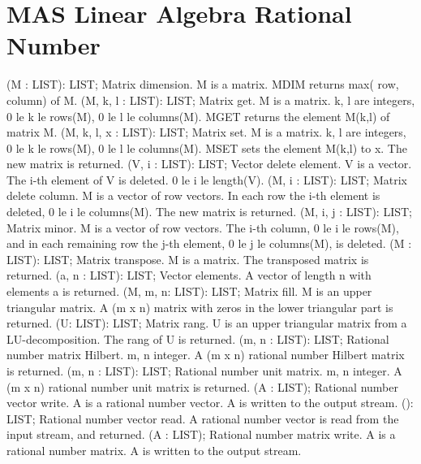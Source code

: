 \section{ MAS Linear Algebra Rational Number  } 
 (M : LIST): LIST; \eproc
\bcom Matrix dimension. M is a matrix. MDIM returns
max( row, column) of M.  \ecom 
{} (M, k, l : LIST): LIST; \eproc
\bcom Matrix get. M is a matrix. k, l are integers, 0 le k le rows(M),
0 le l le columns(M). MGET returns the element M(k,l) of matrix M.  \ecom 
{} (M, k, l, x : LIST): LIST; \eproc
\bcom Matrix set. M is a matrix. k, l are integers, 0 le k le rows(M),
0 le l le  columns(M). MSET sets the element M(k,l) to x. 
The new matrix is returned.  \ecom 
{} (V, i : LIST): LIST; \eproc
\bcom Vector delete element. V is a vector. The i-th element of V
is deleted. 0 le i le length(V).  \ecom 
{} (M, i : LIST): LIST; \eproc
\bcom Matrix delete column. M is a vector of row vectors. In each
row the i-th element is deleted, 0 le i le  columns(M). The new 
matrix is returned.  \ecom 
{} (M, i, j : LIST): LIST; \eproc
\bcom Matrix minor. M is a vector of row vectors. The i-th column,
0 le i le  rows(M), and in each remaining row the j-th element,
0 le j le columns(M), is deleted.  \ecom 
{} (M : LIST): LIST; \eproc
\bcom Matrix transpose. M is a matrix. The transposed matrix is returned.  \ecom 
{} (a, n : LIST): LIST; \eproc
\bcom Vector elements. A vector of length n with elements a is returned.  \ecom 
{} (M, m, n: LIST): LIST; \eproc
\bcom Matrix fill. M is an upper triangular matrix. A (m x n) matrix
with zeros in the lower triangular part is returned.  \ecom 
{} (U: LIST): LIST; \eproc
\bcom Matrix rang. U is an upper triangular matrix from a
LU-decomposition. The rang of U is returned.  \ecom 
{} (m, n : LIST): LIST; \eproc
\bcom Rational number matrix Hilbert. m, n integer. A (m x n) rational
number Hilbert matrix is returned.  \ecom 
{} (m, n : LIST): LIST; \eproc
\bcom Rational number unit matrix. m, n integer. A (m x n) rational
number unit matrix is returned.  \ecom 
{} (A : LIST); \eproc
\bcom Rational number vector write. A is a rational number vector.
A is written to the output stream.  \ecom 
{} (): LIST; \eproc
\bcom Rational number vector read. A rational number vector is
read from the input stream, and returned.  \ecom 
{} (A : LIST); \eproc
\bcom Rational number matrix write. A is a rational number matrix.
A is written to the output stream.  \ecom 
